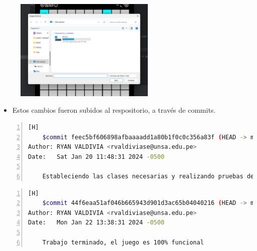 \documentclass{article}
\begin{document}
	\begin{figure}[H]
		\centering
	\includegraphics[width=0.6\textwidth,keepaspectratio]{img/cargar.png}
	\end{figure}
	\begin{itemize}	
		\item Estos cambios fueron subidos al respositorio, a través de commits.
	\end{itemize}
	
	\begin{lstlisting}[language=bash,caption={Commit}, numbers=left][H]
	$commit feec5bf606898afbaaaadd1a80b1f0c0c356a83f (HEAD -> main, origin/main)
Author: RYAN VALDIVIA <rvaldiviase@unsa.edu.pe>
Date:   Sat Jan 20 11:48:31 2024 -0500

    Estableciendo las clases necesarias y realizando pruebas de JavaFx, usando IntelliJ Idea
	\end{lstlisting}
	
	\begin{lstlisting}[language=bash,caption={Commit}, numbers=left][H]
	$commit 44f6eaa51af046b665943d901d3ac65b04040216 (HEAD -> main, origin/main)
Author: RYAN VALDIVIA <rvaldiviase@unsa.edu.pe>
Date:   Mon Jan 22 13:38:31 2024 -0500

    Trabajo terminado, el juego es 100% funcional
	\end{lstlisting}
	
\end{document}
